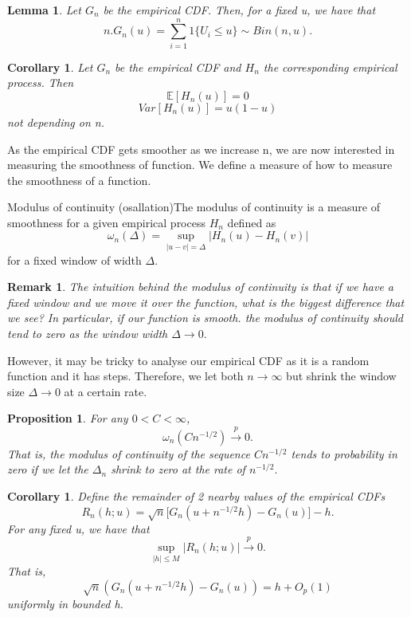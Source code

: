 \documentclass[twoside]{article}
\newtheorem{lemma}[theorem]{Lemma}
\newtheorem{proposition}[theorem]{Proposition}
\newtheorem{corollary}[theorem]{Corollary}
\newtheorem{remark}[theorem]{Remark}
\begin{document}
\begin{lemma}Let $G_n$ be the empirical CDF. Then, for a fixed u, we have that
$$
n.G_n(u) = \sum_{i=1}^{n}1\{U_i \leq u\} \sim Bin(n,u).
$$
\end{lemma}

\begin{corollary}Let $G_n$ be the empirical CDF and $H_n$ the corresponding empirical process. Then 
$$
\mathbb{E}[H_n(u)] = 0
$$
$$
Var[H_n(u)] = u(1 - u)
$$
not depending on n.
\end{corollary}

As the empirical CDF gets smoother as we increase n, we are now interested in measuring the smoothness of function. We define a measure of how to measure the smoothness of a function.

\begin{definition_exam}{Modulus of continuity (osallation)}{}The modulus of continuity is a measure of smoothness for a given empirical process $H_n$ defined as 
$$
\omega_n(\Delta) = \sup_{|u - v| = \Delta}|H_n(u) - H_n(v)|
$$
for a fixed window of width $\Delta.$
\end{definition_exam}

\begin{remark}The intuition behind the modulus of continuity is that if we have a fixed window and we move it over the function, what is the biggest difference that we see? In particular, if our function is smooth. the modulus of continuity should tend to zero as the window width $\Delta \rightarrow 0.$
\end{remark}

However, it may be tricky to analyse our empirical CDF as it is a random function and it has steps. Therefore, we let both $n \rightarrow \infty$ but shrink the window size $\Delta \rightarrow 0$ at a certain rate.

\begin{proposition}For any $0 < C < \infty$, 
$$
\omega_n(Cn^{-1/2}) \xrightarrow{p} 0.
$$
That is, the modulus of continuity of the sequence $Cn^{-1/2}$ tends to probability in zero if we let the $\Delta_n$ shrink to zero at the rate of $n^{-1/2}.$
\end{proposition}

\begin{corollary}Define the remainder of 2 nearby values of the empirical CDFs
$$
R_n(h;u) = \sqrt{n}\bigg[G_n(u + n^{-1/2}h) - G_n(u) \bigg] - h.
$$
For any fixed u, we have that 
$$
\sup_{|h| \leq M}|R_n(h;u)| \xrightarrow{p} 0.
$$
That is,
$$
\sqrt{n}(G_n(u + n^{-1/2}h) - G_n(u)) = h + O_p(1)
$$
uniformly in bounded h.
\end{corollary}
\end{document}
